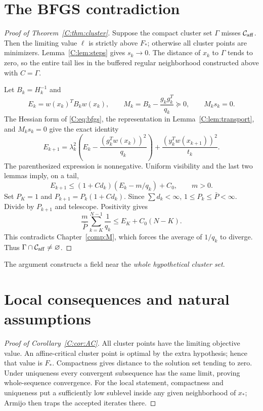 \section{The BFGS contradiction}
\begin{proof}[Proof of Theorem~\ref{C:thm:cluster}]
Suppose the compact cluster set $\Gamma$ misses $\mathcal C_{\rm aff}$. Then the limiting value $\ell$ is strictly above $F_*$; otherwise all cluster points are minimizers. Lemma~\ref{C:lem:steps} gives $s_k\to0$. The distance of $x_k$ to $\Gamma$ tends to zero, so the entire tail lies in the buffered regular neighborhood constructed above with $C=\Gamma$.

Let $B_k=H_k^{-1}$ and
\[
 E_k=w(x_k)^TB_kw(x_k),\qquad
 M_k=B_k-\frac{g_kg_k^T}{q_k}\succeq0,\qquad M_ks_k=0.
\]
The Hessian form of \eqref{C:eq:bfgs}, the representation in Lemma~\ref{C:lem:transport}, and $M_ks_k=0$ give the exact identity
\begin{equation}\label{C:eq:energy}
 E_{k+1}=\lambda_k^2\left(E_k-\frac{(g_k^Tw(x_k))^2}{q_k}\right)
       +\frac{(y_k^Tw(x_{k+1}))^2}{t_k}.
\end{equation}
The parenthesized expression is nonnegative. Uniform visibility and the last two lemmas imply, on a tail,
\[
 E_{k+1}\le (1+C d_k)(E_k-m/q_k)+C_0,
 \qquad m>0.
\]
Set $P_K=1$ and $P_{k+1}=P_k(1+Cd_k)$. Since $\sum d_k<\infty$, $1\le P_k\le\bar P<\infty$. Divide by $P_{k+1}$ and telescope. Positivity gives
\[
 \frac{m}{\bar P}\sum_{k=K}^{N-1}\frac1{q_k}
 \le E_K+C_0(N-K).
\]
This contradicts Chapter~\ref{comp:M}, which forces the average of $1/q_k$ to diverge. Thus $\Gamma\cap\mathcal C_{\rm aff}\ne\varnothing$.
\end{proof}

The argument constructs a field near the \emph{whole hypothetical cluster set}.


\setcounter{section}{6}
\setcounter{theorem}{7}
\setcounter{equation}{16}


\section{Local consequences and natural assumptions}

\begin{proof}[Proof of Corollary~\ref{C:cor:AC}]
All cluster points have the limiting objective value. An affine-critical cluster point is optimal by the extra hypothesis; hence that value is $F_*$. Compactness gives distance to the solution set tending to zero. Under uniqueness every convergent subsequence has the same limit, proving whole-sequence convergence. For the local statement, compactness and uniqueness put a sufficiently low sublevel inside any given neighborhood of $x_*$; Armijo then traps the accepted iterates there.
\end{proof}

